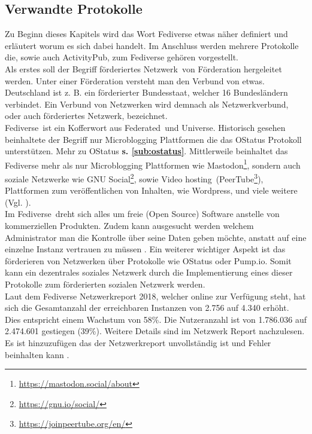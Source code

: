 	\subsection{Verwandte Protokolle}
	Zu Beginn dieses Kapitels wird das Wort Fediverse etwas näher definiert und erläutert worum es sich dabei handelt. Im Anschluss werden mehrere Protokolle die, sowie auch ActivityPub, zum Fediverse gehören vorgestellt.\\
	
	Als erstes soll der Begriff \glqq förderiertes Netzwerk\grqq~von Förderation hergeleitet werden. Unter einer Förderation versteht man den Verbund von etwas. Deutschland ist z. B. ein förderierter Bundesstaat, welcher 16 Bundesländern verbindet. Ein Verbund von Netzwerken wird demnach als Netzwerkverbund, oder auch \glqq förderiertes Netzwerk\grqq, bezeichnet.\\
	
	\glqq Fediverse\grqq~ist ein Kofferwort aus \glqq Federated\grqq~und \glqq Universe\grqq. Historisch gesehen beinhaltete der Begriff nur Microblogging Plattformen die das OStatus Protokoll unterstützen. Mehr zu OStatus \textbf{s. \ref{sub:ostatus}}. Mittlerweile beinhaltet das Fediverse mehr als nur Microblogging Plattformen wie Mastodon\footnote{\url{https://mastodon.social/about}}, sondern auch soziale Netzwerke wie GNU Social\footnote{\url{https://gnu.io/social/}}, sowie \glqq Video hosting\grqq~(PeerTube\footnote{\url{https://joinpeertube.org/en/}}), Plattformen zum veröffentlichen von Inhalten, wie Wordpress, und viele weitere (Vgl. \cite{fediverse}).\\
	
	Im \glqq Fediverse\grqq~dreht sich alles um freie (Open Source) Software anstelle von kommerziellen Produkten. Zudem kann ausgesucht werden welchem Administrator man die Kontrolle über seine Daten geben möchte, anstatt auf eine einzelne Instanz vertrauen zu müssen \cite{fediverse}. Ein weiterer wichtiger Aspekt ist das förderieren von Netzwerken über Protokolle wie OStatus oder Pump.io. Somit kann ein dezentrales soziales Netzwerk durch die Implementierung eines dieser Protokolle zum förderierten sozialen Netzwerk werden.\\
	
	Laut dem Fediverse Netzwerkreport 2018, welcher online zur Verfügung steht, hat sich die Gesamtanzahl der erreichbaren Instanzen von 2.756 auf 4.340 erhöht. Dies entspricht einem Wachstum von 58\%. Die Nutzeranzahl ist von 1.786.036 auf 2.474.601 gestiegen (39\%). Weitere Details sind im Netzwerk Report nachzulesen. Es ist hinzuzufügen das der Netzwerkreport unvollständig ist und Fehler beinhalten kann \cite{fediverse-report}.\\
	
